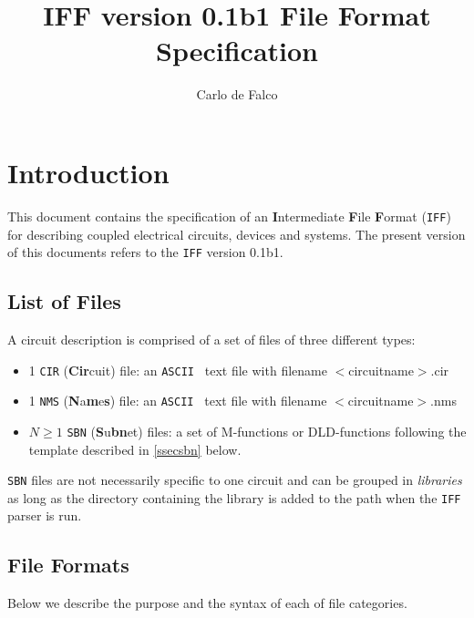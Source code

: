 \documentclass{scrartcl}
\title{IFF version 0.1b1 File Format Specification}
\author{Carlo de Falco}
\newcommand{\Iff}{{\tt IFF}}
\newcommand{\cir}{{\tt CIR}}
\newcommand{\nms}{{\tt NMS}}
\newcommand{\sbn}{{\tt SBN}}
\newcommand{\ord}{{\tt ORD}}
\begin{document}
\maketitle

\section*{Introduction}

This document contains the specification of an {\bf I}ntermediate 
{\bf F}ile {\bf F}ormat ({\Iff}) for describing coupled electrical circuits, 
devices and systems.
The present version of this documents refers to the {\Iff} version 0.1b1.

\subsection{List of Files}
A circuit description is comprised of a set of files of three different types:
\begin{itemize}
\item  1 {\cir} ({\bf Cir}cuit) file: an {\tt ASCII } text file with filename 
{$<$circuitname$>$.cir} 
\item  1 {\nms} ({\bf N}a{\bf m}e{\bf s}) file: an {\tt ASCII } text file with 
filename {$<$circuitname$>$.nms} 
\item  $N \geq 1$ {\sbn} ({\bf S}u{\bf bn}et) files: a set of M-functions or 
DLD-functions following the template described in \autoref{ssecsbn} below. 
\end{itemize}
{\sbn} files are not necessarily specific to one circuit and can be grouped in 
\emph{libraries} as long as the directory containing the library is added to 
the path when the 
{\Iff} parser is run.

\subsection{File Formats}
Below we describe the purpose and the syntax of each of file categories.
\end{document}
